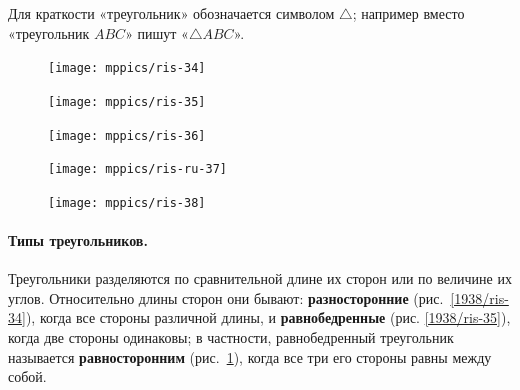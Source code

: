 Для краткости «треугольник» обозначается символом $\triangle$;
например вместо «треугольник $ABC$» пишут «$\triangle ABC$».

\begin{figure}[h!]
\begin{minipage}{.32\textwidth}
\centering
\texttt{[image: mppics/ris-34]}
\end{minipage}\hfill
\begin{minipage}{.32\textwidth}
\centering
\texttt{[image: mppics/ris-35]}
\end{minipage}\hfill
\begin{minipage}{.32\textwidth}
\centering
\texttt{[image: mppics/ris-36]}
\end{minipage}

\medskip

\begin{minipage}{.32\textwidth}
\centering
\caption{}\label{1938/ris-34}
\end{minipage}\hfill
\begin{minipage}{.32\textwidth}
\centering
\caption{}\label{1938/ris-35}
\end{minipage}\hfill
\begin{minipage}{.32\textwidth}
\centering
\caption{}\label{1938/ris-36}
\end{minipage}
\vskip-4mm
\end{figure}

\begin{figure}
\vskip-4mm

\begin{minipage}{24mm}
\centering
\texttt{[image: mppics/ris-ru-37]}
\end{minipage}
\hfill
\begin{minipage}{24mm}
\centering
\texttt{[image: mppics/ris-38]}
\end{minipage}

\medskip

\begin{minipage}{24mm}
\centering
\caption{}\label{1938/ris-37}
\end{minipage}
\hfill
\begin{minipage}{24mm}
\centering
\caption{}\label{1938/ris-38}
\end{minipage}
\end{figure}

\paragraph{Типы треугольников.}\label{1938/35}
Треугольники разделяются по сравнительной длине их сторон или по величине их углов.
Относительно длины сторон они бывают:
\textbf{разносторонние} (рис.~\ref{1938/ris-34}), когда все стороны различной длины, и \textbf{равнобедренные} (рис. \ref{1938/ris-35}), когда две стороны одинаковы;
в частности, равнобедренный треугольник называется \textbf{равносторонним} (рис.~\ref{1938/ris-36}), когда все три его стороны равны между собой.


